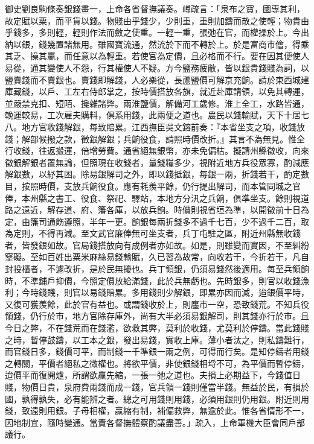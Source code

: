 \begin{pinyinscope}
御史劉良駒條奏銀錢畫一，上命各省督撫議奏。嶟疏言：「泉布之寶，國專其利，故定賦以粟，而平貨以錢。物賤由乎錢少，少則重，重則加鑄而散之使輕；物貴由乎錢多，多則輕，輕則作法而斂之使重。一輕一重，張弛在官，而權操於上。今出納以銀，錢幾置諸無用。雖國寶流通，然流於下而不轉於上。於是富商市儈，得乘其乏、操其贏，而任意以為輕重。若使官為定價，且必格而不行。要在因其便使人易從，通其變使人不怨，行其權使人不疑。方今鹽務疲敝，皆以銀貴錢賤為詞，以鹽賣錢而不賣銀也。賣錢即解錢，人必樂從，長蘆鹽價可解京充餉。請於東西城建庫藏錢，以戶、工左右侍郎掌之，按時價搭放各旗，就近赴庫請領，以免其轉運，並嚴禁克扣、短陌、攙雜諸弊。兩淮鹽價，解備河工歲修。淮上全工，水路皆通，輓運較易，工次雇夫購料，俱系用錢，此兩便之道也。農民以錢輸賦，天下十居七八。地方官收錢解銀，每致賠累。江西撫臣吳文鎔前奏：『本省坐支之項，收錢放錢；解部候撥之款，徵銀解銀；兵餉役食，請照時價改折。』其言不為無見。惟全行收錢，往返搬運，倍增勞費。通省絕無銀幣，亦未免偏枯。擬請州縣徵收，向來徵銀解銀者置無論，但照現在收錢者，量錢糧多少，視附近地方兵役眾寡，酌減應解銀數，以紓其困。除易銀解司之外，即以錢抵銀，每銀一兩，折錢若干，酌定數目，按照時價，支放兵餉役食。應有耗羨平餘，仍行提出解司，而本管同城之官俸，本州縣之書工、役食、祭祀、驛站，本地方分汛之兵餉，俱準坐支。餘則視道路之遠近，解存道、府、籓各庫，以放兵餉。時價則視省垣為準，以開徵前十日為定，由籓司通飭遵照，半年一更。餉銀每兩折錢多不過千七百，少不過千二百，取為定則，不得再減。至文武官廉俸無可坐支者，兵丁屯駐之區，附近州縣無收錢者，皆發銀如故。官局錢搭放向有成例者亦如故。如是，則雖變而實因，不至糾紛窒礙。至如百姓出粟米麻絲易錢輸賦，久已習為故常，向收若干，今折若干，凡自封投櫃者，不遽改折，是於民無擾也。兵丁領銀，仍須易錢然後適用。每至兵領餉時，不準鋪戶抑價，今照定價放給滿錢，此於兵無虧也。先時銀多，則官以收錢漁利；今時錢賤，則官以易錢賠累。多用錢則少解銀，即累亦因而減，迨銀價平時，又復可獲羨餘，此於官有益也。或謂錢收於上，則廛市一空，恐致錢荒。不知兵役領錢，仍行於市，地方官除存庫外，尚有大半必須易銀解司，則其錢亦行於市。且今日之弊，不在錢荒而在錢濫，欲救其弊，莫利於收錢，尤莫利於停鑄。當此錢賤之時，暫停鼓鑄，以工本之銀，發出易錢，實收上庫。薄小者汰之，則私鑄難行，而官錢日多，錢價可平，而制錢一千準銀一兩之例，可得而行矣。是知停鑄者用錢之轉關，平價者絕私之微權也。將欲平價，非使銀錢相埒不可，為平價而暫停鑄，迨價平而復開爐，所謂欲贏先縮，一張一弛之道也。夫損上必期益下，今錢值日賤，物價日貴，泉府費兩錢而成一錢，官兵領一錢則僅當半錢。無益於民，有損於國，孰得孰失，必有能辨之者。總之可用錢則用錢，必須用銀則仍用銀。附近則用錢，致遠則用銀。子母相權，贏縮有制，補偏救弊，無逾於此。惟各省情形不一，因地制宜，隨時變通。當責各督撫體察酌議盡善。」疏入，上命軍機大臣會同戶部議行。


\end{pinyinscope}
